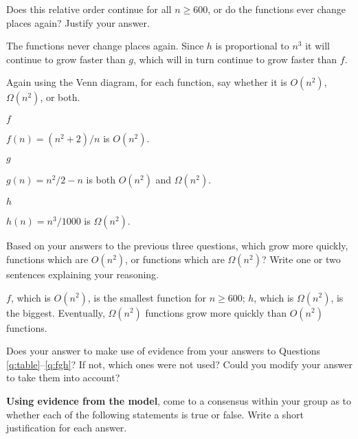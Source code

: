 \documentclass{tufte-handout}
\begin{document}
\begin{questions}
\item Does this relative order continue for all $n \geq 600$, or do
  the functions ever change places again?  Justify your answer.
  \begin{answer}The functions never change places again.  Since $h$
    is proportional to $n^3$ it will continue to grow faster than
    $g$, which will in turn continue to grow faster than
    $f$.\end{answer}
\item \label{q:fgh} Again using the Venn diagram, for each function, say whether it is
  $O(n^2)$, $\Omega(n^2)$, or both.
  \begin{subquestions}
  \item $f$
    \begin{answer}
      $f(n) = (n^2 + 2)/n$ is $O(n^2)$.
    \end{answer}
  \item $g$
    \begin{answer}
      $g(n) = n^2/2 - n$ is both $O(n^2)$ and $\Omega(n^2)$.
    \end{answer}
  \item $h$
    \begin{answer}
      $h(n) = n^3/1000$ is $\Omega(n^2)$.
    \end{answer}
  \end{subquestions}
\item \label{q:synthesize} Based on your answers to the previous three questions, which
  grow more quickly, functions which are $O(n^2)$, or functions which
  are $\Omega(n^2)$? Write one or two sentences explaining your reasoning.

  \begin{answer}
    $f$, which is $O(n^2)$, is the smallest function for $n \geq 600$;
    $h$, which is $\Omega(n^2)$, is the biggest.  Eventually, $\Omega(n^2)$
    functions grow more quickly than $O(n^2)$ functions.
  \end{answer}

\item Does your answer to  make use of evidence
  from your answers to Questions \ref{q:table}--\ref{q:fgh}?  If not,
  which ones were not used?  Could you modify your answer to take
  them into account?
\end{questions}

\noindent \textbf{Using evidence from the model}, come to a consensus
within your group as to whether each of the following statements is
true or false.  Write a short justification for each answer.
\end{document}
